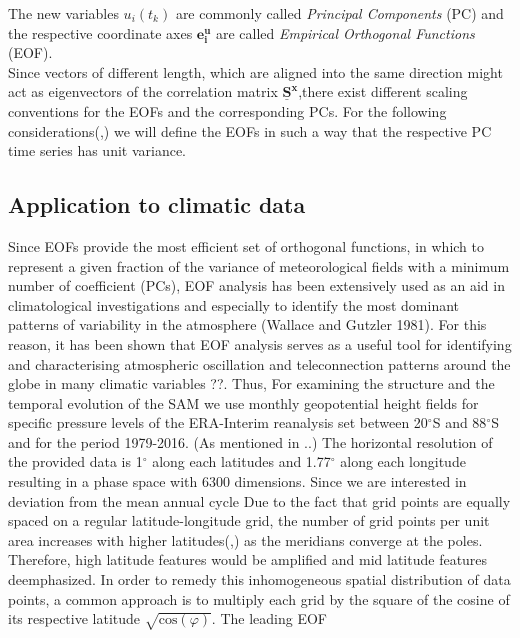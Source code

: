 The new variables $u_i(t_k)$ are commonly called \textit{Principal Components} (PC) and the respective coordinate axes $\bm{e_{i}^u}$ are called \textit{Empirical Orthogonal Functions} (EOF).\\
Since vectors of different length, which are aligned into the same direction might act as eigenvectors of the correlation matrix $\bm{\underline{S}^x}$,there exist different scaling conventions for the EOFs and the corresponding PCs. For the following considerations(,) we will define the EOFs in such a way that the respective PC time series has unit variance.

		\subsection{Application to climatic data}
Since EOFs provide the most efficient set of orthogonal functions, in which to represent a given fraction of the variance of meteorological fields with a minimum number of coefficient (PCs), EOF analysis has been extensively used as an aid in climatological investigations and especially to identify the most dominant patterns of variability in the atmosphere \cite{Kidson1975}(Wallace and Gutzler 1981). For this reason, it has been shown that EOF analysis serves as a useful tool for identifying and characterising atmospheric oscillation and teleconnection patterns around the globe in many climatic variables \cite{Rogers1982} \cite{Thompson2000}??. Thus, 
For examining the structure and the temporal evolution of the SAM we use monthly geopotential height fields for specific pressure levels of the ERA-Interim reanalysis set between 20$^\circ$S and 88$^\circ$S and for the period 1979-2016. (As mentioned in ..) The horizontal resolution of the provided data is 1$^\circ$ along each latitudes and 1.77$^\circ$ along each longitude resulting in a phase space with 6300 dimensions. 
Since we are interested in deviation from the mean annual cycle
Due to the fact that grid points are equally spaced on a regular latitude-longitude grid, the number of grid points per unit area increases with higher latitudes(,)
as the meridians converge at the poles. Therefore, high latitude features would be amplified and mid latitude features deemphasized. In order to remedy this inhomogeneous spatial distribution of data points, a common approach is to multiply each grid by the square of the cosine of its respective latitude $\sqrt{\text{cos}(\varphi)}$.
The leading EOF
